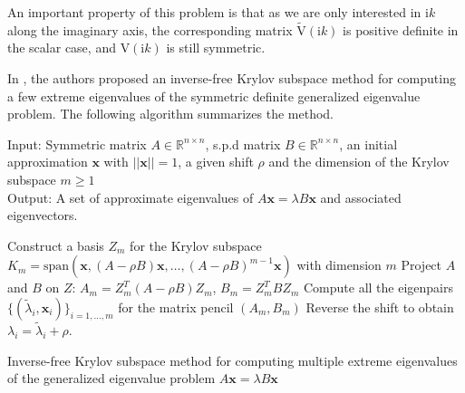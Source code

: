 An important property of this problem is that as we are only interested in $\mathrm{i}k$ along the imaginary axis, the corresponding matrix $\tilde{\mathrm{V}}(\mathrm{i}k)$ is positive definite in the scalar case,
and $\mathrm{V}(\mathrm{i}k)$ is still symmetric.

In \cite{golub2002inverse}\cite{money2005algorithm},
the authors proposed an inverse-free Krylov subspace method for computing a few extreme eigenvalues of the symmetric definite generalized eigenvalue problem.
The following algorithm summarizes the method.

\begin{algorithm}[H]
    \SetAlgoLined
    Input: Symmetric matrix $A\in\mathbb{R}^{n\times n}$, s.p.d matrix $B\in\mathbb{R}^{n\times n}$, an initial approximation $\boldsymbol{x}$ with $||\boldsymbol{x}|| = 1$,
    a given shift $\rho$ and the dimension of the Krylov subspace $m\geq 1$\\
    Output: A set of approximate eigenvalues of $A\boldsymbol{x} = \lambda B\boldsymbol{x}$ and associated eigenvectors.\\
    \begin{algorithmic}[1]
        
        \STATE Construct a basis $Z_{m}$ for the Krylov subspace $K_{m} = \text{span}(\boldsymbol{x}, (A - \rho B)\boldsymbol{x}, \dots, (A - \rho B)^{m-1}\boldsymbol{x})$ with dimension $m$
        \STATE Project $A$ and $B$ on $Z$: $A_{m} = Z_{m}^{T}(A - \rho B)Z_{m}$, $B_{m} = Z_{m}^{T}BZ_{m}$
        \STATE Compute all the eigenpairs $\{(\tilde{\lambda}_{i}, \boldsymbol{x}_{i})\}_{i = 1, \dots, m}$ for the matrix pencil $(A_{m}, B_{m})$
        \STATE Reverse the shift to obtain $\lambda_{i} = \tilde{\lambda}_{i} + \rho$.
        \end{algorithmic}
    \caption{Inverse-free Krylov subspace method for computing multiple extreme eigenvalues of the generalized eigenvalue problem $A\boldsymbol{x} = \lambda B\boldsymbol{x}$}
    \label{Alg for computing the evals kry}
    \end{algorithm}
   
